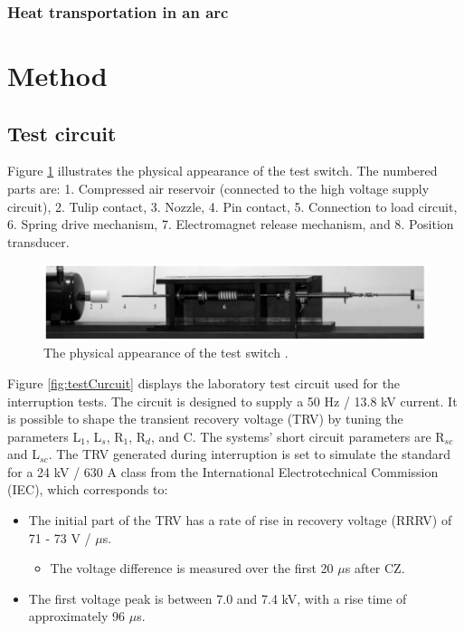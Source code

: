 \documentclass[10pt,a4paper,twoside]{article}
\begin{document}
\subsubsection{Heat transportation in an arc} 




\cleardoublepage

\section{Method}

\subsection{Test circuit} \label{sec:testCir}

Figure \ref{fig:testSwitchRiggEq} illustrates the physical appearance of the test switch. The numbered parts are: 1. Compressed air reservoir (connected to the high voltage supply circuit), 2. Tulip contact, 3. Nozzle, 4. Pin contact, 5. Connection to load circuit, 6. Spring drive mechanism, 7. Electromagnet release mechanism, and 8. Position transducer.

\begin{figure} [H]
\centering
\includegraphics[scale=0.5]{Bilder/Method/switchTest.png}
\caption{The physical appearance of the test switch \cite{bib:AFIMVLBA}.} \label{fig:testSwitchRiggEq}
\end{figure}

Figure \ref{fig:testCurcuit} displays the laboratory test circuit used for the interruption tests. The circuit is designed to supply a 50 Hz / 13.8 kV current. It is possible to shape the transient recovery voltage (TRV) by tuning the parameters L$_1$, L$_s$, R$_1$, R$_d$, and C. The systems' short circuit parameters are R$_{sc}$ and L$_{sc}$. The TRV generated during interruption is set to simulate the standard for a 24 kV / 630 A class from the International Electrotechnical Commission (IEC), which corresponds to:

\begin{itemize}
\item The initial part of the TRV has a rate of rise in recovery voltage (RRRV) of 71 - 73 V / $\mu$s.
	\begin{itemize}
		\item The voltage difference is measured over the first 20 $\mu$s after CZ.
	\end{itemize}
\item The first voltage peak is between 7.0 and 7.4 kV, with a rise time of approximately 96 $\mu$s.
\end{itemize}
\end{document}

